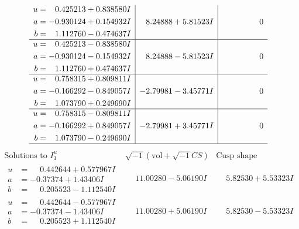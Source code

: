 \documentclass[1p]{elsarticle_modified}
\theoremstyle{definition}
\newcommand{\I}{\sqrt{-1}}
\begin{document}
$$\begin{array}{c|c|c}
\begin{aligned}
u &= \phantom{-}0.425213 + 0.838580 I \\
a &= -0.930124 + 0.154932 I \\
b &= \phantom{-}1.112760 - 0.474637 I\end{aligned}
 & \phantom{-}8.24888 + 5.81523 I & \phantom{-0.000000 } 0 \\ \hline\begin{aligned}
u &= \phantom{-}0.425213 - 0.838580 I \\
a &= -0.930124 - 0.154932 I \\
b &= \phantom{-}1.112760 + 0.474637 I\end{aligned}
 & \phantom{-}8.24888 - 5.81523 I & \phantom{-0.000000 } 0 \\ \hline\begin{aligned}
u &= \phantom{-}0.758315 + 0.809811 I \\
a &= -0.166292 - 0.849057 I \\
b &= \phantom{-}1.073790 + 0.249690 I\end{aligned}
 & -2.79981 - 3.45771 I & \phantom{-0.000000 } 0 \\ \hline\begin{aligned}
u &= \phantom{-}0.758315 - 0.809811 I \\
a &= -0.166292 + 0.849057 I \\
b &= \phantom{-}1.073790 - 0.249690 I\end{aligned}
 & -2.79981 + 3.45771 I & \phantom{-0.000000 } 0\\
 \hline 
 \end{array}$$\newpage$$\begin{array}{c|c|c}  
\text{Solutions to }I^u_{1}& \I (\text{vol} + \sqrt{-1}CS) & \text{Cusp shape}\\
 \hline 
\begin{aligned}
u &= \phantom{-}0.442644 + 0.577967 I \\
a &= -0.37374 + 1.43406 I \\
b &= \phantom{-}0.205523 - 1.112540 I\end{aligned}
 & \phantom{-}11.00280 - 5.06190 I & \phantom{-}5.82530 + 5.53323 I \\ \hline\begin{aligned}
u &= \phantom{-}0.442644 - 0.577967 I \\
a &= -0.37374 - 1.43406 I \\
b &= \phantom{-}0.205523 + 1.112540 I\end{aligned}
 & \phantom{-}11.00280 + 5.06190 I & \phantom{-}5.82530 - 5.53323 I \\ \hline\begin{aligned}

\end{aligned}
\end{array}$$
\end{document}
